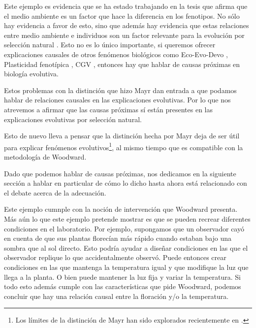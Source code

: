 Este ejemplo es evidencia que se ha estado trabajando en la tesis que afirma que el medio ambiente es un factor que hace la diferencia en los fenotipos. No sólo hay evidencia a favor de esto, sino que además hay evidencia que estas relaciones entre medio ambiente e individuos son un factor relevante para la evolución por selección natural \cite{Jablonka2020, Dayan2020, MacColl2011}. Esto no es lo único importante, si queremos ofrecer explicaciones causales de otros fenómenos biológicos como Eco-Evo-Devo \cite{PfenningEco-Evo-Devo}, Plasticidad fenotípica \cite{WESTEBERHARD20082701}, CGV \cite{CVG}, entonces hay que hablar de causas próximas en biología evolutiva.

Estos problemas con la distinción que hizo Mayr dan entrada a que podamos hablar de relaciones causales en las explicaciones evolutivas. Por lo que nos atrevemos a afirmar que las causas próximas sí están presentes en las explicaciones evolutivas por selección natural.

Esto de nuevo lleva a pensar que la distinción hecha por Mayr deja de ser útil para explicar fenómenos evolutivos\footnote{Los límites de la distinción de Mayr han sido explorados recientemente en \cite{Uller2020, Dayan2020, Laland2011}.}, al mismo tiempo que es compatible con la metodología de Woodward.


Dado que podemos hablar de causas próximas, nos dedicamos en la siguiente sección a hablar en particular de cómo lo dicho hasta ahora está relacionado con el debate acerca de la adecuación.

Este ejemplo cumnple con la noción de intervención que Woodward presenta. Más aún lo que este ejemplo pretende mostrar es que se pueden recrear diferentes condiciones en el laboratorio. Por ejemplo, supongamos que un observador cayó en cuenta de que sus plantas florecían más rápido cuando estaban bajo una sombra que al sol directo. Esto podría ayudar a diseñar condiciones en las que el observador replique lo que accidentalmente observó. Puede entonces crear condiciones en las que mantenga la temperatura igual y que modifique la luz que llega a la planta. O bien puede mantener la luz fija y variar la temperatura. Si todo esto además cumple con las características que pide Woodward, podemos concluir que hay una relación causal entre la floración y/o la temperatura.
